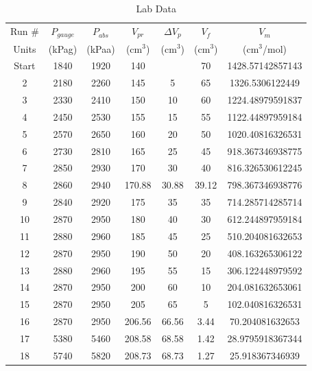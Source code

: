 \documentclass[14pt]{article}
\begin{document}
    \begin{table}[h]
        \caption{Lab Data}
        \centering
            \begin{tabular}{|c|c|c|c|c|c|c|}
                \hline
                Run \#&$P_{gauge}$ &$P_{abs}$& $V_{pr}$ &$\Delta V_p$ &$V_f$ &$V_m$\\
                Units&(kPag)&(kPaa)&(cm$^3$)&(cm$^3$)&(cm$^3$)&(cm$^3$/mol)\\
                \hline
                Start&1840&1920&140&&70&1428.57142857143\\
                2&2180&2260&145&5&65&1326.5306122449\\
                3&2330&2410&150&10&60&1224.48979591837\\
                4&2450&2530&155&15&55&1122.44897959184\\
                5&2570&2650&160&20&50&1020.40816326531\\
                6&2730&2810&165&25&45&918.367346938775\\
                7&2850&2930&170&30&40&816.326530612245\\
                8&2860&2940&170.88&30.88&39.12&798.367346938776\\
                9&2840&2920&175&35&35&714.285714285714\\
                10&2870&2950&180&40&30&612.244897959184\\
                11&2880&2960&185&45&25&510.204081632653\\
                12&2870&2950&190&50&20&408.163265306122\\
                13&2880&2960&195&55&15&306.122448979592\\
                14&2870&2950&200&60&10&204.081632653061\\
                15&2870&2950&205&65&5&102.040816326531\\
                16&2870&2950&206.56&66.56&3.44&70.204081632653\\
                17&5380&5460&208.58&68.58&1.42&28.9795918367344\\
                18&5740&5820&208.73&68.73&1.27&25.918367346939\\
                \hline
            \end{tabular}
    \end{table}
\end{document}

